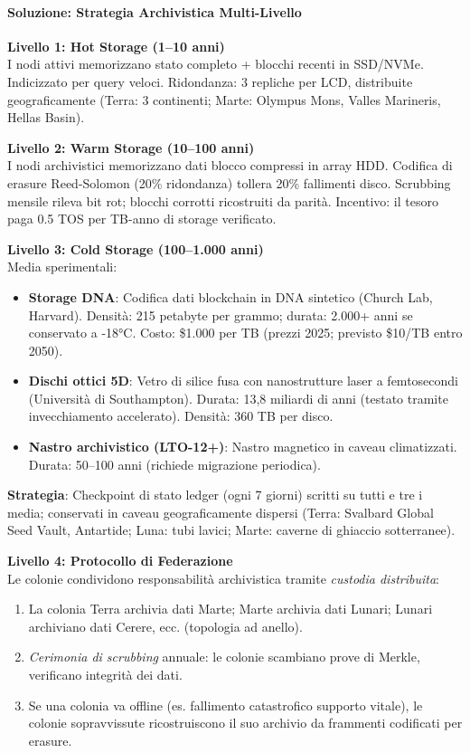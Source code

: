 \documentclass[11pt]{article}
\begin{document}
\paragraph{Soluzione: Strategia Archivistica Multi-Livello}

\textbf{Livello 1: Hot Storage (1--10 anni)}\\
I nodi attivi memorizzano stato completo + blocchi recenti in SSD/NVMe. Indicizzato per query veloci. Ridondanza: 3 repliche per LCD, distribuite geograficamente (Terra: 3 continenti; Marte: Olympus Mons, Valles Marineris, Hellas Basin).

\textbf{Livello 2: Warm Storage (10--100 anni)}\\
I nodi archivistici memorizzano dati blocco compressi in array HDD. Codifica di erasure Reed-Solomon (20\% ridondanza) tollera 20\% fallimenti disco. Scrubbing mensile rileva bit rot; blocchi corrotti ricostruiti da parità. Incentivo: il tesoro paga 0.5 TOS per TB-anno di storage verificato.

\textbf{Livello 3: Cold Storage (100--1.000 anni)}\\
Media sperimentali:
\begin{itemize}[noitemsep]
  \item \textbf{Storage DNA}: Codifica dati blockchain in DNA sintetico (Church Lab, Harvard). Densità: 215 petabyte per grammo; durata: 2.000+ anni se conservato a -18°C. Costo: \$1.000 per TB (prezzi 2025; previsto \$10/TB entro 2050).
  \item \textbf{Dischi ottici 5D}: Vetro di silice fusa con nanostrutture laser a femtosecondi (Università di Southampton). Durata: 13,8 miliardi di anni (testato tramite invecchiamento accelerato). Densità: 360 TB per disco.
  \item \textbf{Nastro archivistico (LTO-12+)}: Nastro magnetico in caveau climatizzati. Durata: 50--100 anni (richiede migrazione periodica).
\end{itemize}
\textbf{Strategia}: Checkpoint di stato ledger (ogni 7 giorni) scritti su tutti e tre i media; conservati in caveau geograficamente dispersi (Terra: Svalbard Global Seed Vault, Antartide; Luna: tubi lavici; Marte: caverne di ghiaccio sotterranee).

\textbf{Livello 4: Protocollo di Federazione}\\
Le colonie condividono responsabilità archivistica tramite \emph{custodia distribuita}:
\begin{enumerate}[noitemsep]
  \item La colonia Terra archivia dati Marte; Marte archivia dati Lunari; Lunari archiviano dati Cerere, ecc. (topologia ad anello).
  \item \emph{Cerimonia di scrubbing} annuale: le colonie scambiano prove di Merkle, verificano integrità dei dati.
  \item Se una colonia va offline (es. fallimento catastrofico supporto vitale), le colonie sopravvissute ricostruiscono il suo archivio da frammenti codificati per erasure.
\end{enumerate}
\end{document}
